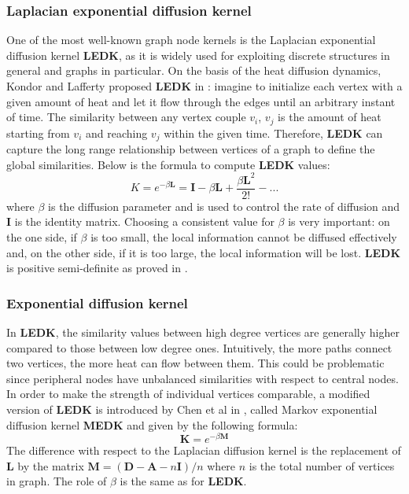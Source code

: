 \documentclass[review]{elsarticle}
\begin{document}
\subsubsection{Laplacian exponential diffusion kernel}
One of the most well-known graph node kernels is the Laplacian exponential diffusion kernel \textbf{LEDK}, as it is widely used for exploiting discrete structures in general and graphs in particular. On the basis of the heat diffusion dynamics, Kondor and Lafferty proposed \textbf{LEDK} in \cite{kondor2002diffusion}: imagine to initialize each vertex with a given amount of heat and let it flow through the edges until an arbitrary instant of time. The similarity between any vertex couple $v_{i}$, $v_{j}$ is the amount of heat starting from $v_{i}$ and reaching $v_{j}$ within the given time. Therefore, \textbf{LEDK} can capture the long range relationship between vertices of a graph to define the global similarities. Below is the formula to compute \textbf{LEDK} values:
\begin{equation} 
\label{LEDK-formula}
K = e^{-\beta \textbf{L}} = \textbf{I} - \beta \textbf{L} + \frac{\beta \textbf{L}^{2}}{2!} - ...
\end{equation}
where $\beta$ is the diffusion parameter and is used to control the rate of diffusion and $\textbf{I}$ is the identity matrix. Choosing a consistent value for $\beta$ is very important: on the one side, if $\beta$ is too small, the local information cannot be diffused effectively and, on the other side, if it is too large, the local information will be lost. \textbf{LEDK} is positive semi-definite as proved in \cite{kondor2002diffusion}.
\subsubsection{Exponential diffusion kernel}
In \textbf{LEDK}, the similarity values between high degree vertices are generally higher compared to those between low degree ones. Intuitively, the more paths connect two vertices, the more heat can flow between them. This could be problematic since peripheral nodes have unbalanced similarities with respect to central nodes. In order to make the strength of individual vertices comparable, a modified version of \textbf{LEDK} is introduced by Chen et al in \cite{chen2014disease}, called Markov exponential diffusion kernel \textbf{MEDK} and given by the following formula:
\begin{equation} \label{MEDK-formula}
\textbf{K} = e^{-\beta \textbf{M}}
\end{equation}
The difference with respect to the Laplacian diffusion kernel is the replacement of \textbf{L} by the matrix $\textbf{M}=(\textbf{D}-\textbf{A}-n\textbf{I})/n$ where $n$ is the total number of vertices in graph. The role of $\beta$ is the same as for \textbf{LEDK}.
\end{document}
